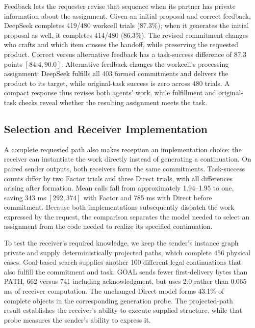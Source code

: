 \documentclass[sigconf,nonacm,balance=false]{aamas}
\begin{document}
Feedback lets the requester revise that sequence when its partner has private information about the assignment. Given an initial proposal and correct feedback, DeepSeek completes 419/480 workcell trials (87.3\%); when it generates the initial proposal as well, it completes 414/480 (86.3\%). The revised commitment changes who crafts and which item crosses the handoff, while preserving the requested product. Correct versus alternative feedback has a task-success difference of 87.3 points $[84.4,90.0]$. Alternative feedback changes the workcell's processing assignment: DeepSeek fulfills all 403 formed commitments and delivers the product to its target, while original-task success is zero across 480 trials. A compact response thus revises both agents' work, while fulfillment and original-task checks reveal whether the resulting assignment meets the task.

\subsection{Selection and Receiver Implementation}
\label{sec:binding-results}\label{sec:backend-results}\label{sec:private-structure}\label{sec:request-results}
A complete requested path also makes reception an implementation choice: the receiver can instantiate the work directly instead of generating a continuation. On paired sender outputs, both receivers form the same commitments. Task-success counts differ by two Factor trials and three Direct trials, with all differences arising after formation. Mean calls fall from approximately 1.94--1.95 to one, saving 343 ms $[292,374]$ with Factor and 785 ms with Direct before commitment. Because both implementations subsequently dispatch the work expressed by the request, the comparison separates the model needed to select an assignment from the code needed to realize its specified continuation.

To test the receiver's required knowledge, we keep the sender's instance graph private and supply deterministically projected paths, which complete 456 physical cases. Goal-based search supplies another 100 different legal continuations that also fulfill the commitment and task. GOAL sends fewer first-delivery bytes than PATH, 662 versus 741 including acknowledgment, but uses 2.0 rather than 0.065 ms of receiver computation. The unchanged Direct model forms 43.1\% of complete objects in the corresponding generation probe. The projected-path result establishes the receiver's ability to execute supplied structure, while that probe measures the sender's ability to express it.
\end{document}
